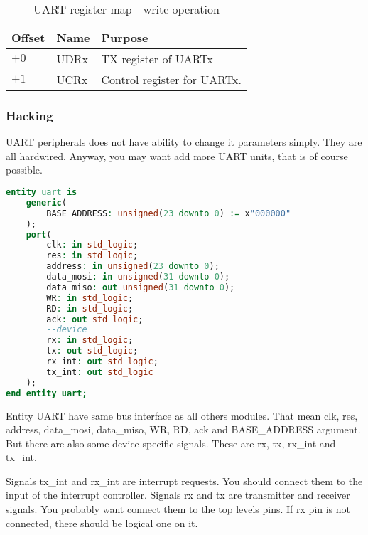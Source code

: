 \begin{table}[h]
    \centering
    \begin{tabular}{|l|l|l|}
        \hline
        \textbf{Offset} & \textbf{Name} & \textbf{Purpose}            \\ \hline
        $+0$            & UDRx          & TX register of UARTx        \\ \hline
        $+1$            & UCRx          & Control register for UARTx. \\ \hline
    \end{tabular}
    \caption{UART register map - write operation}
    \label{tab:uart_write_reg_map}
\end{table}

\subsubsection{Hacking}

UART peripherals does not have ability to change it parameters simply. They are
all hardwired. Anyway, you may want add more UART units, that is of course
possible.

\begin{lstlisting}[language=VHDL, frame=single]
entity uart is
    generic(
        BASE_ADDRESS: unsigned(23 downto 0) := x"000000"
    );
    port(
        clk: in std_logic;
        res: in std_logic;
        address: in unsigned(23 downto 0);
        data_mosi: in unsigned(31 downto 0);
        data_miso: out unsigned(31 downto 0);
        WR: in std_logic;
        RD: in std_logic;
        ack: out std_logic;
        --device
        rx: in std_logic;
        tx: out std_logic;
        rx_int: out std_logic;
        tx_int: out std_logic
    );
end entity uart;
\end{lstlisting}

Entity UART have same bus interface as all others modules. That mean clk, res,
address, data\_mosi, data\_miso, WR, RD, ack and BASE\_ADDRESS argument. But there
are also some device specific signals. These are rx, tx, rx\_int and tx\_int.

Signals tx\_int and rx\_int are interrupt requests. You should connect them to
the input of the interrupt controller. Signals rx and tx are transmitter and
receiver signals. You probably want connect them to the top levels pins. If rx
pin is not connected, there should be logical one on it.
